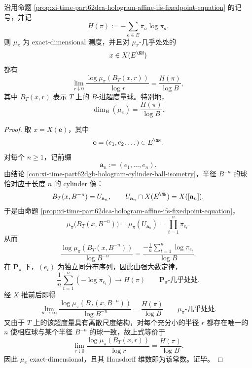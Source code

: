 \begin{theorem}\label{thm:xi-time-part62dca-hologram-bernoulli-exact-dimension-formula}
沿用命题 \ref{prop:xi-time-part62dca-hologram-affine-ifs-fixedpoint-equation} 的记号，并记
\[
H(\pi):=-\sum_{a\in E}\pi_a\log \pi_a.
\]
则 \(\mu_\pi\) 为 exact-dimensional 测度，并且对 \(\mu_\pi\)-几乎处处的
\[
x\in X(E^{\NN})
\]
都有
\[
\lim_{r\downarrow 0}\frac{\log \mu_\pi(B_T(x,r))}{\log r}
=
\frac{H(\pi)}{\log B},
\]
其中 \(B_T(x,r)\) 表示 \(T\) 上的 \(B\)-进超度量球。特别地，
\[
\dim_{\mathrm H}(\mu_\pi)=\frac{H(\pi)}{\log B}.
\]
\end{theorem}
\begin{proof}
取 \(x=X(\mathbf e)\)，其中
\[
\mathbf e=(e_1,e_2,\dots)\in E^{\NN}.
\]
对每个 \(n\ge 1\)，记前缀
\[
\mathbf a_n:=(e_1,\dots,e_n).
\]
由结论 \ref{con:xi-time-part62dgb-hologram-cylinder-ball-isometry}，半径 \(B^{-n}\) 的球恰对应于长度 \(n\) 的 cylinder 像：
\[
B_T(x,B^{-n})
=
U_{\mathbf a_n},
\qquad
U_{\mathbf a_n}\cap X(E^{\NN})=X([\mathbf a_n]).
\]
于是由命题 \ref{prop:xi-time-part62dca-hologram-affine-ifs-fixedpoint-equation}，
\[
\mu_\pi\!\bigl(B_T(x,B^{-n})\bigr)
=
\mu_\pi(U_{\mathbf a_n})
=
\prod_{t=1}^{n}\pi_{e_t}.
\]
从而
\[
\frac{\log \mu_\pi(B_T(x,B^{-n}))}{\log B^{-n}}
=
\frac{-\frac1n\sum_{t=1}^{n}\log \pi_{e_t}}{\log B}.
\]
在 \(\mathbf P_\pi\) 下，\((e_t)\) 为独立同分布序列，因此由强大数定律，
\[
\frac1n\sum_{t=1}^{n}(-\log \pi_{e_t})\longrightarrow H(\pi)
\qquad \mathbf P_\pi\text{-几乎处处}.
\]
经 \(X\) 推前后即得
\[
\lim_{n\to\infty}
\frac{\log \mu_\pi(B_T(x,B^{-n}))}{\log B^{-n}}
=
\frac{H(\pi)}{\log B}
\qquad \mu_\pi\text{-几乎处处}.
\]
又由于 \(T\) 上的该超度量具有离散尺度结构，对每个充分小的半径 \(r\) 都存在唯一的 \(n\) 使相应球与某个半径 \(B^{-n}\) 的球一致，故上式等价于
\[
\lim_{r\downarrow 0}\frac{\log \mu_\pi(B_T(x,r))}{\log r}
=
\frac{H(\pi)}{\log B}.
\]
因此 \(\mu_\pi\) exact-dimensional，且其 Hausdorff 维数即为该常数。证毕。
\end{proof}

